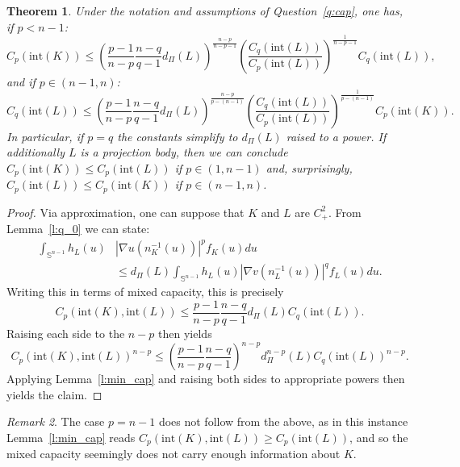 \documentclass[11pt]{amsart}
\newtheorem{theorem}{Theorem}[section]
\theoremstyle{definition}
\theoremstyle{remark}
\newtheorem{remark}[theorem]{Remark}
\numberwithin{equation}{section}
\newcommand{\s}{\mathbb{S}}
\begin{document}
 \begin{theorem}
 Under the notation and assumptions of Question~\ref{q:cap}, one has, if $p<n-1$:
\begin{equation*}
    C_p(\text{int} (K)) \leq\left(\frac{p-1}{n-p}\frac{n-q}{q-1}d_{\Pi}(L)\right)^{\frac{n-p}{n-p-1}} \left(\frac{C_q(\text{int}(L))}{C_p(\text{int}(L))}\right)^\frac{1}{n-p-1}C_q(\text{int}(L)),
\end{equation*}
and if $p\in(n-1,n)$:
\begin{equation*}
    C_q(\text{int}(L)) \leq \left(\frac{p-1}{n-p}\frac{n-q}{q-1}d_{\Pi}(L)\right)^{\frac{n-p}{p-(n-1)}} \left(\frac{C_q(\text{int}(L))}{C_p(\text{int}(L))}\right)^\frac{1}{p-(n-1)} C_p(\text{int} (K)).
\end{equation*}
In particular, if $p=q$ the constants simplify to $d_{\Pi}(L)$ raised to a power. If additionally $L$ is a projection body, then we can conclude
$C_p(\text{int} (K)) \leq C_p(\text{int} (L))$ if $p\in(1,n-1)$ and, surprisingly, $C_p(\text{int} (L)) \leq C_p(\text{int} (K))$ if $p\in (n-1,n)$.
 \end{theorem}
 \begin{proof}
Via approximation, one can suppose that $K$ and $L$ are $C^2_+$. From Lemma~\ref{l:q_0} we can state:
\begin{equation*}
\begin{split}
    \int_{\s^{n-1}}h_L(u)&|\nabla u\left(n_K^{-1}(u)\right)|^p f_K(u) du 
    \\
    &\leq d_{\Pi}(L)\int_{\s^{n-1}} h_L(u) |\nabla v\left(n_L^{-1}(u)\right)|^q f_L(u)du.
    \end{split}
\end{equation*}
Writing this in terms of mixed capacity, this is precisely
\begin{equation*}
    C_p(\text{int} (K),\text{int} (L)) \leq\frac{p-1}{n-p}\frac{n-q}{q-1} d_{\Pi}(L)C_q(\text{int}(L)).
\end{equation*}
Raising each side to the $n-p$ then yields
\begin{equation*}
    C_p(\text{int} (K),\text{int} (L))^{n-p} \leq\left(\frac{p-1}{n-p}\frac{n-q}{q-1}\right)^{n-p} d^{n-p}_{\Pi}(L)C_q(\text{int}(L))^{n-p}.
\end{equation*}
Applying Lemma~\ref{l:min_cap} and raising both sides to appropriate powers then yields the claim.
\end{proof}

\begin{remark}The case $p=n-1$ does not follow from the above, as in this instance Lemma~\ref{l:min_cap} reads
$ C_p(\text{int} (K),\text{int} (L))\geq  C_p(\text{int} (L))$, and so the mixed capacity seemingly does not carry enough information about $K$.
\end{remark}
\end{document}
